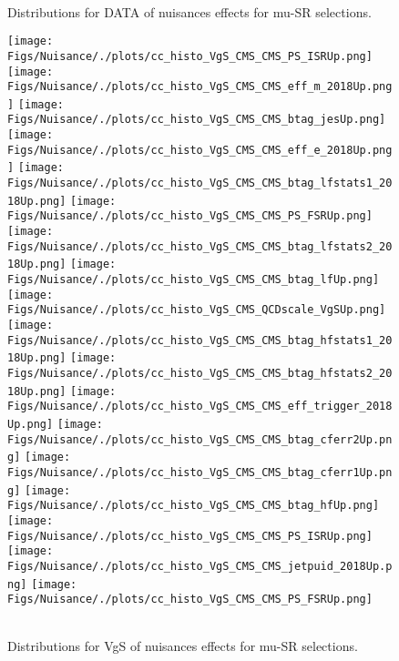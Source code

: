 \begin{figure*}[htbp]  
\centering 
\\ 
\caption{ 
   Distributions for DATA of nuisances effects for mu-SR selections.
} 
\label{fig:DATA_mu_SR} 
\end{figure*} 




\begin{figure*}[htbp]  
\centering 
\texttt{[image: Figs/Nuisance/./plots/cc\_histo\_VgS\_CMS\_CMS\_PS\_ISRUp.png]}
\texttt{[image: Figs/Nuisance/./plots/cc\_histo\_VgS\_CMS\_CMS\_eff\_m\_2018Up.png]}
\texttt{[image: Figs/Nuisance/./plots/cc\_histo\_VgS\_CMS\_CMS\_btag\_jesUp.png]}
\texttt{[image: Figs/Nuisance/./plots/cc\_histo\_VgS\_CMS\_CMS\_eff\_e\_2018Up.png]}
\texttt{[image: Figs/Nuisance/./plots/cc\_histo\_VgS\_CMS\_CMS\_btag\_lfstats1\_2018Up.png]}
\texttt{[image: Figs/Nuisance/./plots/cc\_histo\_VgS\_CMS\_CMS\_PS\_FSRUp.png]}
\texttt{[image: Figs/Nuisance/./plots/cc\_histo\_VgS\_CMS\_CMS\_btag\_lfstats2\_2018Up.png]}
\texttt{[image: Figs/Nuisance/./plots/cc\_histo\_VgS\_CMS\_CMS\_btag\_lfUp.png]}
\texttt{[image: Figs/Nuisance/./plots/cc\_histo\_VgS\_CMS\_QCDscale\_VgSUp.png]}\\
\texttt{[image: Figs/Nuisance/./plots/cc\_histo\_VgS\_CMS\_CMS\_btag\_hfstats1\_2018Up.png]}
\texttt{[image: Figs/Nuisance/./plots/cc\_histo\_VgS\_CMS\_CMS\_btag\_hfstats2\_2018Up.png]}
\texttt{[image: Figs/Nuisance/./plots/cc\_histo\_VgS\_CMS\_CMS\_eff\_trigger\_2018Up.png]}
\texttt{[image: Figs/Nuisance/./plots/cc\_histo\_VgS\_CMS\_CMS\_btag\_cferr2Up.png]}
\texttt{[image: Figs/Nuisance/./plots/cc\_histo\_VgS\_CMS\_CMS\_btag\_cferr1Up.png]}
\texttt{[image: Figs/Nuisance/./plots/cc\_histo\_VgS\_CMS\_CMS\_btag\_hfUp.png]}
\texttt{[image: Figs/Nuisance/./plots/cc\_histo\_VgS\_CMS\_CMS\_PS\_ISRUp.png]}
\texttt{[image: Figs/Nuisance/./plots/cc\_histo\_VgS\_CMS\_CMS\_jetpuid\_2018Up.png]}
\texttt{[image: Figs/Nuisance/./plots/cc\_histo\_VgS\_CMS\_CMS\_PS\_FSRUp.png]}\\
\\ 
\caption{ 
   Distributions for VgS of nuisances effects for mu-SR selections.
} 
\label{fig:VgS_mu_SR} 
\end{figure*} 


